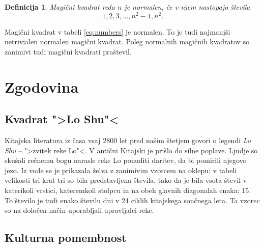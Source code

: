 \documentclass[a4paper,12pt]{article}
\newtheorem{definicija}{Definicija}
\begin{document}

\begin{definicija}
   Magični kvadrat reda \(n\) je \emph{normalen}, če v njem nastopajo števila
   \begin{equation}
      \label{eq:numbers}
      1, 2, 3, \ldots, n^2-1, n^2.
   \end{equation}
\end{definicija}

Magični kvadrat v tabeli \ref{eq:numbers} je normalen.
To je tudi najmanjši netrivialen normalen magični kvadrat.
Poleg normalnih magičnih kvadratov so zanimivi tudi magični kvadrati praštevil. %


\section{Zgodovina}

\subsection{Kvadrat ">Lo Shu"<}

Kitajska literatura iz časa vsaj 2800 let pred našim štetjem govori o legendi
\emph{Lo Shu} -- ">zvitek reke Lo"<. V antični Kitajski je prišlo do
silne poplave. Ljudje so skušali rečnemu bogu narasle reke Lo ponuditi daritev,
da bi pomirili njegovo jezo. Iz vode se je prikazala želva z zanimivim vzorcem
na oklepu: v tabeli velikosti tri krat tri so bila predstavljena števila, tako
da je bila vsota števil v katerikoli vrstici, kateremkoli stolpcu in na obeh
glavnih diagonalah enaka: 15. To število je tudi enako številu dni v 24 ciklih
kitajskega sončnega leta. Ta vzorec so na določen način uporabljali upravljalci
reke.


\subsection{Kulturna pomembnost}
\end{document}
